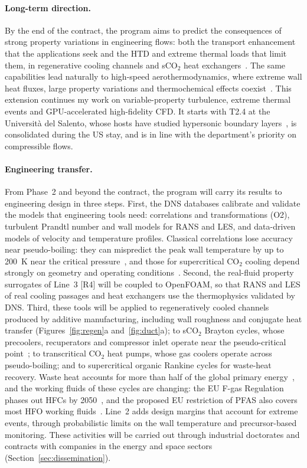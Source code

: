 \documentclass[11pt]{article}
\begin{document}
\paragraph{Long-term direction.} By the end of the contract, the program aims to predict the
consequences of strong property variations in engineering flows: both the transport
enhancement that the applications seek and the HTD and extreme thermal loads that limit them, in
regenerative cooling channels and sCO$_2$ heat exchangers~\cite{Pizzarelli2018,Ahn2015}. The
same capabilities lead naturally to high-speed aerothermodynamics, where extreme wall heat
fluxes, large property variations and thermochemical effects
coexist~\cite{Urzay2018,DiRenzoUrzay2021,Passiatore2022}. This extension continues my work on
variable-property turbulence, extreme thermal events and GPU-accelerated high-fidelity CFD. It
starts with T2.4 at the Universit\`a del Salento, whose hosts have studied hypersonic
boundary layers~\cite{DiRenzoUrzay2021,Passiatore2022}, is consolidated during the US stay, and
is in line with the department's priority on compressible flows.

\paragraph{Engineering transfer.} From Phase~2 and beyond the contract, the program will carry its
results to engineering design in three steps. First, the DNS databases calibrate and validate the
models that engineering tools need: correlations and transformations (O2), turbulent Prandtl number
and wall models for RANS and LES, and data-driven models of velocity and temperature profiles.
Classical correlations lose accuracy near pseudo-boiling: they can mispredict the peak wall
temperature by up to 200~K near the critical pressure~\cite{Nasuti2021}, and those for
supercritical CO$_2$ cooling depend strongly on geometry and operating
conditions~\cite{Pitla1998}. Second, the real-fluid property surrogates of Line~3 [R4] will be
coupled to OpenFOAM, so that RANS and LES of real cooling passages and heat exchangers use the
thermophysics validated by DNS. Third, these tools will be applied to regeneratively cooled channels
produced by additive manufacturing, including wall roughness and conjugate heat transfer
(Figures~\ref{fig:regen}a and~\ref{fig:duct}a); to sCO$_2$ Brayton cycles, whose precoolers,
recuperators and compressor inlet operate near the pseudo-critical point~\cite{Ahn2015}; to
transcritical CO$_2$ heat pumps, whose gas coolers operate across pseudo-boiling; and to
supercritical organic Rankine cycles for waste-heat recovery. Waste heat accounts for more than half
of the global primary energy~\cite{Markides2025}, and the working fluids of these cycles are changing:
the EU F-gas Regulation phases out HFCs by 2050~\cite{FGas2024}, and the proposed EU restriction of
PFAS also covers most HFO working fluids~\cite{ECHA2025}. Line~2 adds design margins that account for
extreme events, through probabilistic limits on the wall temperature and precursor-based monitoring.
These activities will be carried out through industrial doctorates and contracts with companies in
the energy and space sectors (Section~\ref{sec:dissemination}).
\end{document}
